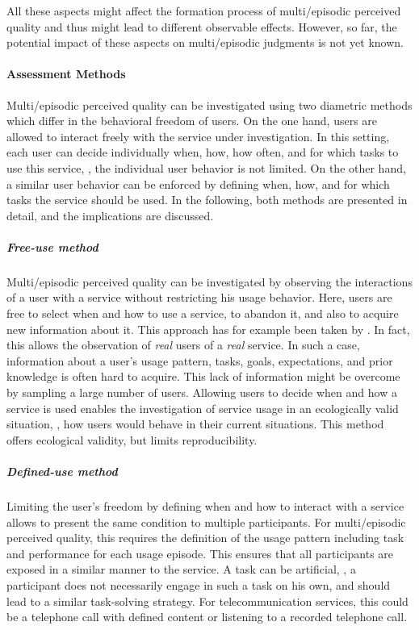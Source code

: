 All these aspects might affect the formation process of multi\-/episodic perceived quality and thus might lead to different observable effects.
However, so far, the potential impact of these aspects on multi\-/episodic judgments is not yet known.

\paragraph{Assessment Methods}
Multi\-/episodic perceived quality can be investigated using two diametric methods which differ in the behavioral freedom of users.
On the one hand, users are allowed to interact freely with the service under investigation.
In this setting, each user can decide individually when, how, how often, and for which tasks to use this service, \ie, the individual user behavior is not limited.
On the other hand, a similar user behavior can be enforced by defining when, how, and for which tasks the service should be used.
In the following, both methods are presented in detail, and the implications are discussed.

\subparagraph*{Free-use method}
Multi\-/episodic perceived quality can be investigated by observing the interactions of a user with a service without restricting his usage behavior.
Here, users are free to select when and how to use a service, to abandon it, and also to acquire new information about it.
This approach has for example been taken by \citet{duncanson_average_1969}.
In fact, this allows the observation of \emph{real} users of a \emph{real} service.
In such a case, information about a user's usage pattern, tasks, goals, expectations, and prior knowledge is often hard to acquire.
This lack of information might be overcome by sampling a large number of users.
Allowing users to decide when and how a service is used enables the investigation of service usage in an ecologically valid situation, \ie, how  users would behave in their current situations.
This method offers ecological validity, but limits reproducibility.

\subparagraph*{Defined-use method}\label{method:definedUse}
Limiting the user's freedom by defining when and how to interact with a service allows to present the same condition to multiple participants.
For multi\-/episodic perceived quality, this requires the definition of the usage pattern including task and performance for each usage episode.
This ensures that all participants are exposed in a similar manner to the service.
A task can be artificial, \ie, a participant does not necessarily engage in such a task on his own, and should lead to a similar task-solving strategy.
For telecommunication services, this could be a telephone call with defined content or listening to a recorded telephone call. %


